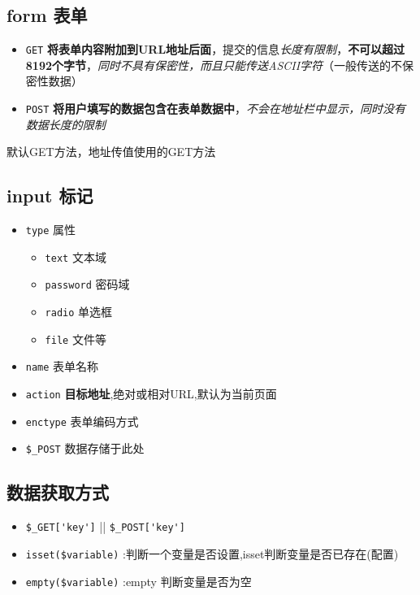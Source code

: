 \documentclass[UTF8,a4paper,12pt]{ctexbook}
\begin{document}
		\subsection{form 表单}
			\begin{itemize}
				\item \verb|GET| \textbf{将表单内容附加到URL地址后面}，提交的信息\textit{长度有限制}，\textbf{不可以超过8192个字节}，\textit{同时不具有保密性，而且只能传送ASCII字符}（一般传送的不保密性数据）
				\item \verb|POST| \textbf{将用户填写的数据包含在表单数据中}，\textit{不会在地址栏中显示，同时没有数据长度的限制}
			\end{itemize}
			
			默认GET方法，地址传值使用的GET方法
			
		\subsection{input 标记}
			\begin{itemize}
				\item \verb|type| 属性
					\begin{itemize}
						\item \verb|text| 文本域
						\item \verb|password| 密码域
						\item \verb|radio| 单选框
						\item \verb|file| 文件等
					\end{itemize}
				\item \verb|name| 表单名称
				\item \verb|action| \textbf{目标地址},绝对或相对URL,默认为当前页面
				\item \verb|enctype| 表单编码方式
				\item \verb|$_POST| 数据存储于此处
			\end{itemize}
		
		\subsection{数据获取方式}
			\begin{itemize}
				\item \verb|$_GET['key']| || \verb|$_POST['key']|
				\item \verb|isset($variable)| :判断一个变量是否设置,isset判断变量是否已存在(配置)
				\item \verb|empty($variable)| :empty 判断变量是否为空
			\end{itemize}
			
\end{document}
